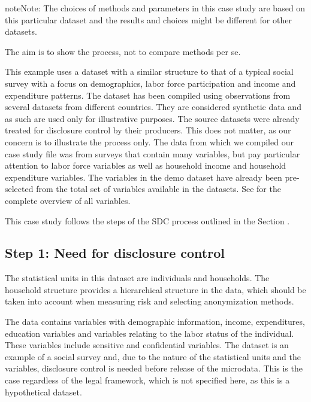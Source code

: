 \documentclass[letterpaper,10pt,english]{sphinxmanual}
\begin{document}
\begin{sphinxadmonition}{note}{Note:}
The choices of methods and parameters in
this case study are based on this particular dataset and the results and
choices might be different for other datasets.
\end{sphinxadmonition}

The aim is to show the process, not to compare methods per se.

This example uses a dataset with a similar structure to that of a
typical social survey with a focus on demographics, labor force
participation and income and expenditure patterns. The dataset has been
compiled using observations from several datasets from different
countries. They are considered synthetic data and as such are used only
for illustrative purposes. The source datasets were already treated for
disclosure control by their producers. This does not matter, as our
concern is to illustrate the process only. The data from which we
compiled our case study file was from surveys that contain many
variables, but pay particular attention to labor force variables as well
as household income and household expenditure variables. The variables
in the demo dataset have already been pre-selected from the total set of
variables available in the datasets. See
for the complete overview of all variables.

This case study follows the steps of the SDC process outlined in the Section
.


\subsection{Step 1: Need for disclosure control}
\label{\detokenize{case_studies:step-1-need-for-disclosure-control}}
The statistical units in this dataset are individuals and households.
The household structure provides a hierarchical structure in the data,
which should be taken into account when measuring risk and selecting
anonymization methods.

The data contains variables with demographic information, income,
expenditures, education variables and variables relating to the labor
status of the individual. These variables include sensitive and
confidential variables. The dataset is an example of a social survey
and, due to the nature of the statistical units and the variables,
disclosure control is needed before release of the microdata. This is
the case regardless of the legal framework, which is not specified here,
as this is a hypothetical dataset.
\end{document}
